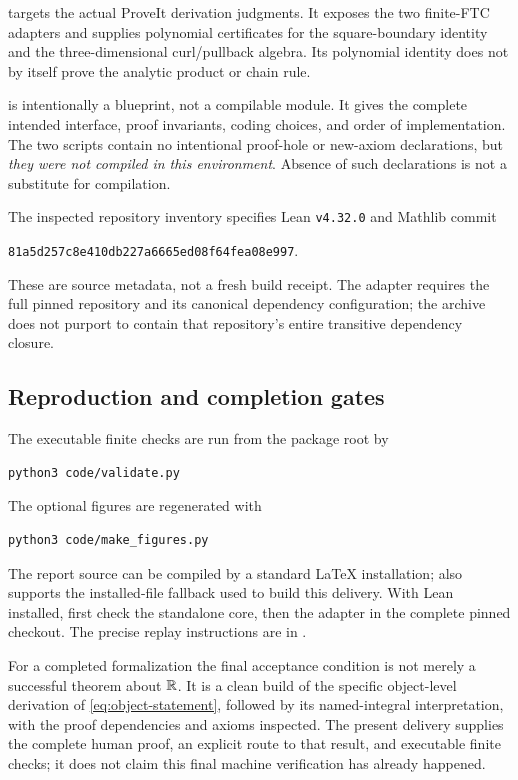  targets the actual ProveIt derivation
judgments. It exposes the two finite-FTC adapters and supplies
polynomial certificates for the square-boundary identity and the
three-dimensional curl/pullback algebra. Its polynomial identity
does not by itself prove the analytic product or chain rule.

 is intentionally a blueprint,
not a compilable module. It gives the complete intended interface,
proof invariants, coding choices, and order of implementation.
The two  scripts contain no intentional proof-hole or
new-axiom declarations, but \emph{they were not compiled in this
environment}. Absence of such declarations is not a substitute
for compilation.

The inspected repository inventory specifies Lean \texttt{v4.32.0}
and Mathlib commit
\begin{center}
\small\texttt{81a5d257c8e410db227a6665ed08f64fea08e997}.
\end{center}
These are source metadata, not a fresh build receipt. The adapter
requires the full pinned repository and its canonical dependency
configuration; the archive does not purport to contain that
repository's entire transitive dependency closure.

\subsection{Reproduction and completion gates}

The executable finite checks are run from the package root by
\begin{lstlisting}
python3 code/validate.py
\end{lstlisting}
The optional figures are regenerated with
\begin{lstlisting}
python3 code/make_figures.py
\end{lstlisting}
The report source can be compiled by a standard LaTeX installation;
 also supports the installed-file fallback used
to build this delivery. With Lean installed, first check the
standalone core, then the adapter in the complete pinned checkout.
The precise replay instructions are in .

For a completed formalization the final acceptance condition is not
merely a successful theorem about $\mathbb R$. It is a clean build of the
specific object-level derivation of \eqref{eq:object-statement},
followed by its named-integral interpretation, with the proof
dependencies and axioms inspected. The present delivery supplies
the complete human proof, an explicit route to that result, and
executable finite checks; it does not claim this final machine
verification has already happened.

